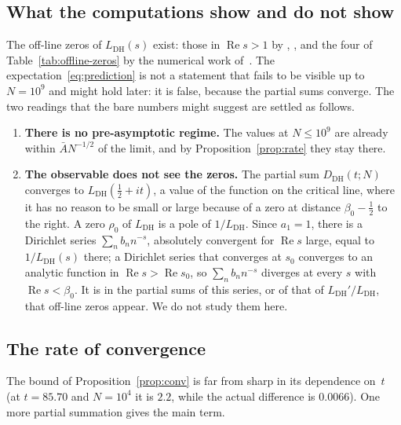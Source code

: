 \documentclass[11pt]{amsart}
\theoremstyle{definition}
\theoremstyle{remark}
\renewcommand{\DH}{\mathrm{DH}}
\newcommand{\re}{\operatorname{Re}}
\newcommand{\Abar}{\bar A}
\begin{document}
\subsection{What the computations show and do not show}
\label{ssec:interpretations}

The off-line zeros of $L_{\DH}(s)$ exist: those in $\re s>1$ by
\cite{DavenportHeilbronn1936}, \cite[\S10.25]{Titchmarsh1986}, and the
four of Table~\ref{tab:offline-zeros} by the numerical work
of~\cite{Spira1994, BalanzarioSanchezOrtiz2007}.  The
expectation~\eqref{eq:prediction} is not a statement that fails to be
visible up to $N=10^9$ and might hold later: it is false, because the
partial sums converge.  The two readings that the bare numbers might
suggest are settled as follows.

\begin{enumerate}[label=(\alph*)]
\item \textbf{There is no pre-asymptotic regime.}  The values at
  $N\le10^9$ are already within $\Abar N^{-1/2}$ of the limit, and by
  Proposition~\ref{prop:rate} they stay there.

\item \textbf{The observable does not see the zeros.}  The partial sum
  $D_{\DH}(t; N)$ converges to $L_{\DH}(\tfrac12+it)$, a value of the
  function on the critical line, where it has no reason to be small or
  large because of a zero at distance $\beta_0-\tfrac12$ to the right.  A
  zero $\rho_0$ of $L_{\DH}$ is a pole of $1/L_{\DH}$.  Since $a_1=1$,
  there is a Dirichlet series $\sum_nb_nn^{-s}$, absolutely convergent
  for $\re s$ large, equal to $1/L_{\DH}(s)$ there; a Dirichlet series
  that converges at $s_0$ converges to an analytic function in
  $\re s>\re s_0$, so $\sum_nb_nn^{-s}$ diverges at every $s$ with
  $\re s<\beta_0$.  It is in the partial sums of this series, or of that
  of $L_{\DH}'/L_{\DH}$, that off-line zeros appear.  We do not study
  them here.
\end{enumerate}

\subsection{The rate of convergence}\label{ssec:onset}

The bound of Proposition~\ref{prop:conv} is far from sharp in its
dependence on~$t$ (at $t=85.70$ and $N=10^4$ it is $2.2$, while the
actual difference is $0.0066$).  One more partial summation gives the
main term.
\end{document}
